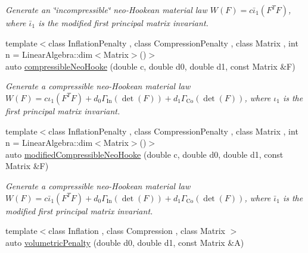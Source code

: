 \begin{DoxyCompactItemize}
\begin{DoxyCompactList}\small\item\em Generate an \char`\"{}incompressible\char`\"{} neo-\/\-Hookean material law $ W(F)=c\bar\iota_1(F^T F) $, where $\bar\iota_1$ is the modified first principal matrix invariant. \end{DoxyCompactList}\item 
\hypertarget{group__Rubber_gac5c39cd9de55f4f0220a806cf28a7b30}{{\footnotesize template$<$class Inflation\-Penalty , class Compression\-Penalty , class Matrix , int n = Linear\-Algebra\-::dim$<$\-Matrix$>$()$>$ }\\auto \hyperlink{group__Rubber_gac5c39cd9de55f4f0220a806cf28a7b30}{compressible\-Neo\-Hooke} (double c, double d0, double d1, const Matrix \&F)}\label{group__Rubber_gac5c39cd9de55f4f0220a806cf28a7b30}

\begin{DoxyCompactList}\small\item\em Generate a compressible neo-\/\-Hookean material law $ W(F)=c\iota_1(F^T F)+d_0\Gamma_\mathrm{In}(\det(F))+d_1\Gamma_\mathrm{Co}(\det(F)) $, where $\iota_1$ is the first principal matrix invariant. \end{DoxyCompactList}\item 
\hypertarget{group__Rubber_gac10942df03f037afdf0a81d330361a6b}{{\footnotesize template$<$class Inflation\-Penalty , class Compression\-Penalty , class Matrix , int n = Linear\-Algebra\-::dim$<$\-Matrix$>$()$>$ }\\auto \hyperlink{group__Rubber_gac10942df03f037afdf0a81d330361a6b}{modified\-Compressible\-Neo\-Hooke} (double c, double d0, double d1, const Matrix \&F)}\label{group__Rubber_gac10942df03f037afdf0a81d330361a6b}

\begin{DoxyCompactList}\small\item\em Generate a compressible neo-\/\-Hookean material law $ W(F)=c\bar\iota_1(F^T F)+d_0\Gamma_\mathrm{In}(\det(F))+d_1\Gamma_\mathrm{Co}(\det(F)) $, where $\bar\iota_1$ is the modified first principal matrix invariant. \end{DoxyCompactList}\item 
\hypertarget{namespaceFunG_ad26faeb264bb4b1cd7e70f3811c366c8}{{\footnotesize template$<$class Inflation , class Compression , class Matrix $>$ }\\auto \hyperlink{namespaceFunG_ad26faeb264bb4b1cd7e70f3811c366c8}{volumetric\-Penalty} (double d0, double d1, const Matrix \&A)}\label{namespaceFunG_ad26faeb264bb4b1cd7e70f3811c366c8}


\end{DoxyCompactItemize}
